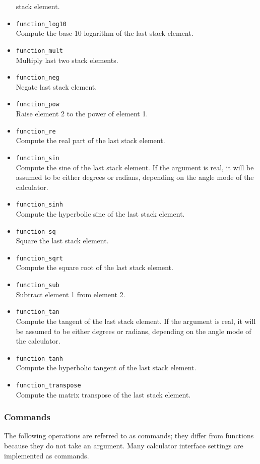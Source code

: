 \documentclass[11pt,notitlepage]{article}
\begin{document}
\begin{itemize}
      stack element.
   \item {\tt function\_log10} \\
      Compute the base-10 logarithm of the last stack element.
   \item {\tt function\_mult} \\
      Multiply last two stack elements.
   \item {\tt function\_neg} \\
      Negate last stack element.
   \item {\tt function\_pow} \\
      Raise element 2 to the power of element 1.
   \item {\tt function\_re} \\
      Compute the real part of the last stack element.
   \item {\tt function\_sin} \\
      Compute the sine of the last stack element.  If the argument is real, it
      will be assumed to be either degrees or radians, depending on the angle
      mode of the calculator.
   \item {\tt function\_sinh} \\
      Compute the hyperbolic sine of the last stack element.
   \item {\tt function\_sq} \\
      Square the last stack element.
   \item {\tt function\_sqrt} \\
      Compute the square root of the last stack element.
   \item {\tt function\_sub} \\
      Subtract element 1 from element 2.
   \item {\tt function\_tan} \\
      Compute the tangent of the last stack element.  If the argument is real,
      it will be assumed to be either degrees or radians, depending on the
      angle mode of the calculator.
   \item {\tt function\_tanh} \\
      Compute the hyperbolic tangent of the last stack element.
   \item {\tt function\_transpose} \\
      Compute the matrix transpose of the last stack element.
\end{itemize}


\subsubsection{Commands}
\label{commands}
The following operations are referred to as commands; they differ from functions because
they do not take an argument.  Many calculator interface settings are implemented as commands.
\end{document}
